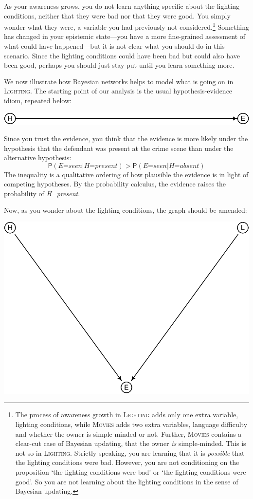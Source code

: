 \documentclass[
  11pt,
  dvipsnames,enabledeprecatedfontcommands, todos]{scrartcl}
\newcommand{\pr}[1]{\ensuremath{\mathsf{P}(#1)}}
\begin{document}
As your awareness grows, you do not learn anything specific about the
lighting conditions, neither that they were bad nor that they were good.
You simply wonder what they were, a variable you had previously not
considered.\footnote{The process of awareness growth in
  \textsc{Lighting} adds only one extra variable, lighting conditions,
  while \textsc{Movies} adds two extra variables, language difficulty
  and whether the owner is simple-minded or not. Further,
  \textsc{Movies} contains a clear-cut case of Bayesian updating, that
  the owner \emph{is} simple-minded. This is not so in
  \textsc{Lighting}. Strictly speaking, you are learning that it is
  \emph{possible} that the lighting conditions were bad. However, you
  are not conditioning on the proposition `the lighting conditions were
  bad' or `the lighting conditions were good'. So you are not learning
  about the lighting conditions in the sense of Bayesian updating.}
Something has changed in your epistemic state---you have a more
fine-grained assessment of what could have happened---but it is not
clear what you should do in this scenario. Since the lighting conditions
could have been bad but could also have been good, perhaps you should
just stay put until you learn something more.

We now illustrate how Bayesian networks helps to model what is going on
in \textsc{Lighting}. The starting point of our analysis is the usual
hypothesis-evidence idiom, repeated below:

\begin{center}\includegraphics[width=0.5\linewidth,height=0.5\textheight]{ReplyToSteeleStefansson5_files/figure-latex/heDAG-1} \end{center}

\noindent Since you trust the evidence, you think that the evidence is
more likely under the hypothesis that the defendant was present at the
crime scene than under the alternative hypothesis:
\[\pr{\textit{E=seen} \vert \textit{H=present}} > \pr{\textit{E=seen} \vert \textit{H=absent}}\]
The inequality is a qualitative ordering of how plausible the evidence
is in light of competing hypotheses. By the probability calculus, the
evidence raises the probability of \textit{H=present}.

Now, as you wonder about the lighting conditions, the graph should be
amended:

\begin{center}\includegraphics[width=0.5\linewidth,height=0.3\textheight]{ReplyToSteeleStefansson5_files/figure-latex/lighting2DAG-1} \end{center}
\end{document}
